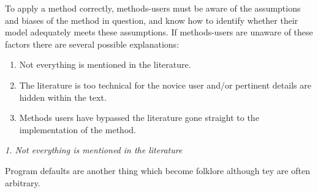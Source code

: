 \documentclass[a4paper,12pt]{article}
\renewcommand{\subsection}[1]{
  \bigskip
  \begin{center}
  \begin{large}
  \normalfont\itshape #1
  \end{large}
  \end{center}
}
\begin{document}
To apply a method correctly, methods-users must be aware of the assumptions and biases of the method in question, and know how to identify whether their model adequately meets these assumptions. If methods-users are unaware of these factors there are several possible explanations:

\begin{enumerate}
\item Not everything is mentioned in the literature.
\item The literature is too technical for the novice user and/or pertinent details are hidden within the text.
\item Methods users have bypassed the literature gone straight to the implementation of the method.
\end{enumerate}


\subsection{1. Not everything is mentioned in the literature}



Program defaults are another thing which become folklore although tey are often arbitrary.




\end{document}
